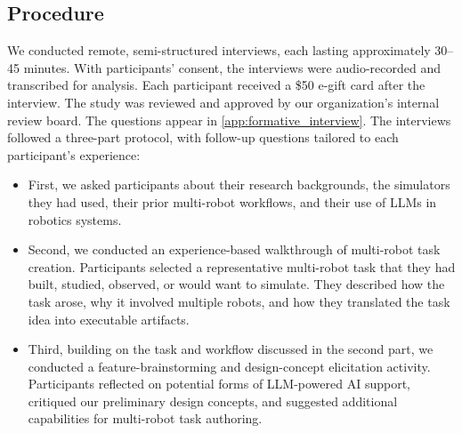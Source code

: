 \subsection{Procedure}

We conducted remote, semi-structured interviews, each lasting approximately 30--45 minutes.
With participants' consent, the interviews were audio-recorded and transcribed for analysis.
Each participant received a \$50 e-gift card after the interview.
The study was reviewed and approved by our organization's internal review board.
The questions appear in \autoref{app:formative_interview}.
The interviews followed a three-part protocol, with follow-up questions tailored to each participant's experience:

\begin{itemize}
    \item First, we asked participants about their research backgrounds, the simulators they had used, their prior multi-robot workflows, and their use of LLMs in robotics systems.

    \item Second, we conducted an experience-based walkthrough of multi-robot task creation. 
    Participants selected a representative multi-robot task that they had built, studied, observed, or would want to simulate. 
    They described how the task arose, why it involved multiple robots, and how they translated the task idea into executable artifacts.

    \item Third, building on the task and workflow discussed in the second part, we conducted a feature-brainstorming and design-concept elicitation activity. 
    Participants reflected on potential forms of LLM-powered AI support, critiqued our preliminary design concepts, and suggested additional capabilities for multi-robot task authoring.
\end{itemize}



